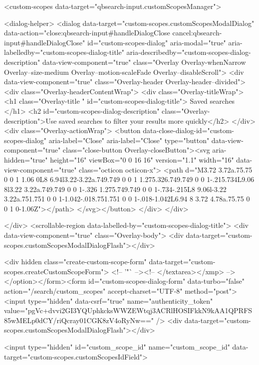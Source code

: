     <custom-scopes data-target="qbsearch-input.customScopesManager">
    
<dialog-helper>
  <dialog data-target="custom-scopes.customScopesModalDialog" data-action="close:qbsearch-input#handleDialogClose cancel:qbsearch-input#handleDialogClose" id="custom-scopes-dialog" aria-modal="true" aria-labelledby="custom-scopes-dialog-title" aria-describedby="custom-scopes-dialog-description" data-view-component="true" class="Overlay Overlay-whenNarrow Overlay--size-medium Overlay--motion-scaleFade Overlay--disableScroll">
    <div data-view-component="true" class="Overlay-header Overlay-header--divided">
  <div class="Overlay-headerContentWrap">
    <div class="Overlay-titleWrap">
      <h1 class="Overlay-title " id="custom-scopes-dialog-title">
        Saved searches
      </h1>
        <h2 id="custom-scopes-dialog-description" class="Overlay-description">Use saved searches to filter your results more quickly</h2>
    </div>
    <div class="Overlay-actionWrap">
      <button data-close-dialog-id="custom-scopes-dialog" aria-label="Close" aria-label="Close" type="button" data-view-component="true" class="close-button Overlay-closeButton"><svg aria-hidden="true" height="16" viewBox="0 0 16 16" version="1.1" width="16" data-view-component="true" class="octicon octicon-x">
    <path d="M3.72 3.72a.75.75 0 0 1 1.06 0L8 6.94l3.22-3.22a.749.749 0 0 1 1.275.326.749.749 0 0 1-.215.734L9.06 8l3.22 3.22a.749.749 0 0 1-.326 1.275.749.749 0 0 1-.734-.215L8 9.06l-3.22 3.22a.751.751 0 0 1-1.042-.018.751.751 0 0 1-.018-1.042L6.94 8 3.72 4.78a.75.75 0 0 1 0-1.06Z"></path>
</svg></button>
    </div>
  </div>
  
</div>
      <scrollable-region data-labelled-by="custom-scopes-dialog-title">
        <div data-view-component="true" class="Overlay-body">        <div data-target="custom-scopes.customScopesModalDialogFlash"></div>

        <div hidden class="create-custom-scope-form" data-target="custom-scopes.createCustomScopeForm">
        <!-- '"` --><!-- </textarea></xmp> --></option></form><form id="custom-scopes-dialog-form" data-turbo="false" action="/search/custom_scopes" accept-charset="UTF-8" method="post"><input type="hidden" data-csrf="true" name="authenticity_token" value="pgVc+dvvi2GI3YQUphkcksWWZEWtqj3ACRlHOSIFkkN9kAA1QPRFS85wMELp0dCY/riQcray01CGK8zV4oRyNw==" />
          <div data-target="custom-scopes.customScopesModalDialogFlash"></div>

          <input type="hidden" id="custom_scope_id" name="custom_scope_id" data-target="custom-scopes.customScopesIdField">

